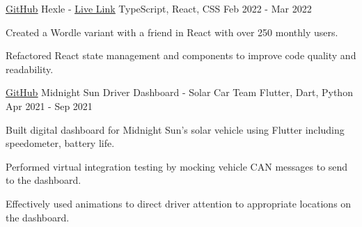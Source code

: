 

\begin{cventries}

  \cventry
    {\href{https://github.com/frankljin/hexle/}{\underline{GitHub}}} %
    {Hexle - \href{https://frankljin.github.io/hexle/}{\underline{Live Link}}} %
    {TypeScript, React, CSS} %
    {Feb 2022 - Mar 2022} %
    {
      \begin{cvitems} %
        \item {Created a Wordle variant with a friend in {React} with over 250 monthly users.}
        \item {Refactored React state management and components to improve code quality and readability.}
      \end{cvitems}
    }

  \cventry
    {\href{https://github.com/uw-midsun/telemetry_xiv}{\underline{GitHub}}} %
    {Midnight Sun Driver Dashboard - Solar Car Team} %
    {Flutter, Dart, Python} %
    {Apr 2021 - Sep 2021} %
    {
      \begin{cvitems} %
        \item {Built digital dashboard for Midnight Sun's solar vehicle using {Flutter} including speedometer, battery life.}
        \item {Performed virtual {integration testing} by mocking vehicle CAN messages to send to the dashboard.}
        \item {Effectively used animations to direct driver attention to appropriate locations on the dashboard.}
      \end{cvitems}
    }



\end{cventries}
